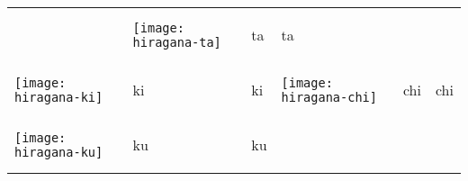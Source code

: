 \documentclass[a4paper,12pt]{extarticle}
\begin{document}
\begin{longtable}{|lll|lll|}
	                                   &
	\begin{minipage}{0.2\textwidth}
		\centerline{
			\texttt{[image: hiragana-ta]}
		}
	\end{minipage}
	                                   &
	\begin{CJK}{UTF8}{min}ta\end{CJK}
	                                   &
	ta
	\\
	\begin{minipage}{0.2\textwidth}
		\centerline{
			\texttt{[image: hiragana-ki]}
		}
	\end{minipage}
	                                   &
	\begin{CJK}{UTF8}{min}ki\end{CJK}
	                                   &
	ki

	                                   &
	\begin{minipage}{0.2\textwidth}
		\centerline{
			\texttt{[image: hiragana-chi]}
		}
	\end{minipage}
	                                   &
	\begin{CJK}{UTF8}{min}chi\end{CJK}
	                                   &
	chi
	\\
	\begin{minipage}{0.2\textwidth}
		\centerline{
			\texttt{[image: hiragana-ku]}
		}
	\end{minipage}
	                                   &
	\begin{CJK}{UTF8}{min}ku\end{CJK}
	                                   &
	ku


\end{longtable}
\end{document}
